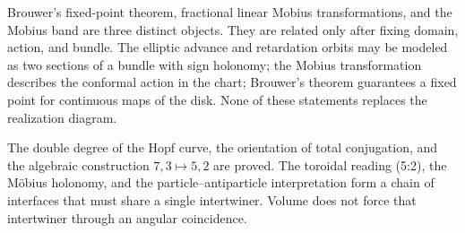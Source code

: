 Brouwer's fixed-point theorem, fractional linear Mobius transformations,
and the Mobius band are three distinct objects. They are related only
after fixing domain, action, and bundle. The elliptic advance and
retardation orbits may be modeled as two sections of a bundle with sign
holonomy; the Mobius transformation describes the conformal action in the chart;
Brouwer's theorem guarantees a fixed point for continuous maps of the disk.
None of these statements replaces the realization diagram.

\begin{remark}
The double degree of the Hopf curve, the orientation of total conjugation, and the algebraic construction \(7,3\mapsto5,2\) are proved. The toroidal reading (5{:}2), the Möbius holonomy, and the particle--antiparticle interpretation form a chain of interfaces that must share a single intertwiner. Volume does not force that intertwiner through an angular coincidence.
\end{remark}
